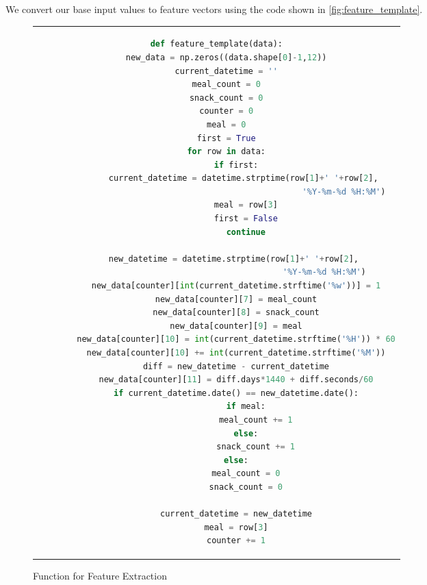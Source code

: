 We convert our base input values to feature vectors using the code shown in \autoref{fig:feature_template}.

\begin{figure}[htpb]
  \centering
  \begin{tabular}{c}
  \begin{lstlisting}[language=python, breaklines, breakatwhitespace]
def feature_template(data):
    new_data = np.zeros((data.shape[0]-1,12))
    current_datetime = ''
    meal_count = 0
    snack_count = 0
    counter = 0
    meal = 0
    first = True
    for row in data:
        if first:
            current_datetime = datetime.strptime(row[1]+' '+row[2], 
                                                    '%Y-%m-%d %H:%M')
            meal = row[3]
            first = False
            continue

        new_datetime = datetime.strptime(row[1]+' '+row[2], 
                                            '%Y-%m-%d %H:%M')
        new_data[counter][int(current_datetime.strftime('%w'))] = 1
        new_data[counter][7] = meal_count
        new_data[counter][8] = snack_count
        new_data[counter][9] = meal
        new_data[counter][10] = int(current_datetime.strftime('%H')) * 60
        new_data[counter][10] += int(current_datetime.strftime('%M'))
        diff = new_datetime - current_datetime
        new_data[counter][11] = diff.days*1440 + diff.seconds/60
        if current_datetime.date() == new_datetime.date():
            if meal:
                meal_count += 1
            else:
                snack_count += 1
        else:
            meal_count = 0
            snack_count = 0

        current_datetime = new_datetime
        meal = row[3]
        counter += 1
  \end{lstlisting}
  \end{tabular}
  \caption[Function for Feature Extraction]{Function for Feature Extraction}
  \label{fig:feature_template}
\end{figure}

